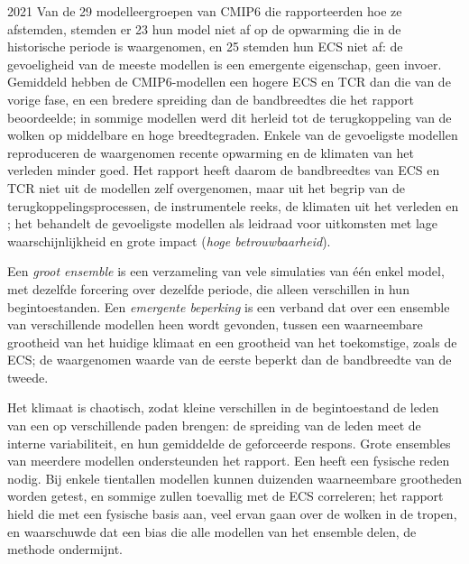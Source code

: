 \begin{dated}{2021}
Van de 29 modelleergroepen van CMIP6 die rapporteerden hoe ze afstemden, stemden er 23
hun model niet af op de opwarming die in de historische periode is waargenomen, en
25 stemden hun ECS niet af: de gevoeligheid van de meeste modellen is een emergente
eigenschap, geen invoer. Gemiddeld hebben de CMIP6-modellen een hogere ECS en
TCR dan die van de vorige fase, en een bredere spreiding dan de bandbreedtes die het rapport
beoordeelde; in sommige modellen werd dit herleid tot de terugkoppeling van
de wolken op middelbare en hoge breedtegraden. Enkele van de gevoeligste modellen
reproduceren de waargenomen recente opwarming en de klimaten van het verleden minder
goed. Het rapport heeft daarom de bandbreedtes van ECS en TCR niet uit de modellen zelf overgenomen,
maar uit het begrip van de terugkoppelingsprocessen,
de instrumentele reeks, de klimaten uit het verleden en ; het behandelt de gevoeligste modellen als leidraad voor
uitkomsten met lage waarschijnlijkheid en grote impact (\emph{hoge betrouwbaarheid}).
\end{dated}

\begin{definition}\label{def:b3:climate-models:evaluation}
Een \emph{groot ensemble} is een verzameling van vele simulaties
van één enkel model, met dezelfde forcering over dezelfde periode, die alleen
verschillen in hun begintoestanden. Een \emph{emergente
beperking} is een verband dat over een ensemble van
verschillende modellen heen wordt gevonden, tussen een waarneembare grootheid van het
huidige klimaat en een grootheid van het toekomstige, zoals de ECS; de
waargenomen waarde van de eerste beperkt dan de bandbreedte van de tweede.
\end{definition}

Het klimaat is chaotisch, zodat kleine verschillen in de begintoestand de
leden van een  op verschillende paden brengen: de spreiding van de
leden meet de interne variabiliteit, en hun gemiddelde de geforceerde
respons. Grote ensembles van meerdere modellen ondersteunden het rapport. Een
 heeft een fysische reden nodig. Bij enkele tientallen modellen
kunnen duizenden waarneembare grootheden worden getest, en sommige zullen toevallig met de
ECS correleren; het rapport hield die met een fysische basis aan, veel ervan
gaan over de wolken in de tropen, en waarschuwde dat een bias die alle
modellen van het ensemble delen, de methode ondermijnt.

